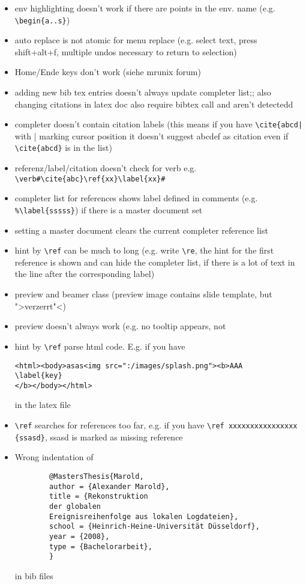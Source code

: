 \documentclass[10pt,a4paper,landscape]{report}
\begin{document}
\begin{itemize}
\item  env highlighting doesn't work if there are points in the env. name (e.g. \verb+\begin{a..s}+)
\item auto replace is not atomic for menu replace (e.g. select text, press shift+alt+f, multiple undos necessary to return to selection)
\item Home/Ende keys don't work (siehe mrunix forum)
\item adding new bib tex entries doesn't always update completer list;; also changing citations in latex doc also require bibtex call and aren't detectedd
\item completer doesn't contain citation labels (this means if you have \verb+\cite{abcd|+ with | marking cursor position it doesn't suggest abcdef as citation even if \verb+\cite{abcd}+ is in the list)
\item referenz/label/citation doesn't check for verb e.g. \verb+\verb#\cite{abc}\ref{xx}\label{xx}#+
\item completer list for references shows label defined in comments (e.g. \verb+%\label{sssss}+) if there is a master document set
\item setting a master document clears the current completer reference list
\item hint by  \verb+\ref+  can be much to long (e.g. write \verb+\re+, the hint for the first reference is shown and can hide the completer list, if there is a lot of text in the line after the corresponding label)
\item preview and beamer class (preview image contains slide template, but ">verzerrt"<)
\item preview doesn't always work (e.g. no tooltip appears, not 
\item hint by \verb+\ref+ parse html code. E.g. if you have \begin{verbatim}
<html><body>asas<img src=":/images/splash.png"><b>AAA
\label{key}
</b></body></html>
\end{verbatim} in the latex file
\item \verb+\ref+ searches for references too far, e.g. if you have  \verb+\ref xxxxxxxxxxxxxxxx {ssasd}+, ssasd is marked as missing reference
	\item Wrong indentation of \begin{verbatim}
		@MastersThesis{Marold,
		author = {Alexander Marold},
		title = {Rekonstruktion 
		der globalen 
		Ereignisreihenfolge aus lokalen Logdateien},
		school = {Heinrich-Heine-Universität Düsseldorf},
		year = {2008},
		type = {Bachelorarbeit},
		}
	\end{verbatim} in bib files
\end{itemize} 
\end{document}
